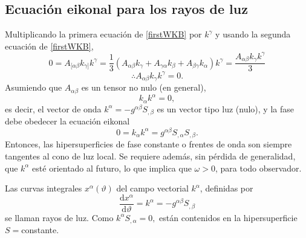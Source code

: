 \subsection{Ecuación eikonal para los rayos de luz}
Multiplicando la primera ecuación de \eqref{firstWKB} por $k^\gamma$ y usando la segunda ecuación de \eqref{firstWKB},
$$0=A_{[\alpha\beta}k_{\gamma]}k^\gamma=\frac{1}{3}\left( A_{\alpha\beta}k_\gamma+A_{\gamma\alpha}k_\beta+A_{\beta\gamma}k_\alpha\right)k^\gamma=\frac{A_{\alpha\beta}k_\gamma k^\gamma}{3}$$
$$\therefore A_{\alpha\beta}k_\gamma k^\gamma=0.$$
Asumiendo que $A_{\alpha\beta}$ es un tensor no nulo (en general),
\begin{equation}
	k_\alpha k^\alpha=0,
\end{equation}
es decir, el vector de onda $k^\alpha=-g^{\alpha\beta}S_{,\beta}$ es un vector tipo luz (nulo), y la fase debe obedecer la ecuación eikonal
\begin{equation}\label{eikonalEquation}
	0=k_\alpha k^\alpha = g^{\alpha\beta}S_{,\alpha}S_{,\beta}.
\end{equation}
Entonces, las hipersuperficies de fase constante o frentes de onda son siempre tangentes al cono de luz local. Se requiere además, sin pérdida de generalidad, que $k^\alpha$ esté orientado al futuro, lo que implica que $\omega>0$, para todo observador.

Las curvas integrales $x^\alpha (\vartheta)$ del campo vectorial $k^\alpha$, definidas por
\begin{equation}\label{integralCurves}
\frac{\mathrm{d}x^\alpha}{\mathrm{d}\vartheta}=k^\alpha = -g^{\alpha\beta} S_{,\beta}
\end{equation}
se llaman rayos de luz. Como $k^\alpha S_{,\alpha}=0,$ están contenidos en la hipersuperficie $S=$constante.

